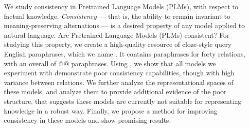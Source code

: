 We study consistency in Pretrained Language Models (PLMs), with respect to factual knowledge. \textit{Consistency} --- that is, the ability to remain invariant to meaning-preserving alternations --- is a desired property of any model applied to natural language. Are Pretrained Language Models (PLMs) consistent?
For studying this property, we create a high-quality resource of cloze-style query English paraphrases, which we name \resource{}. It contains paraphrases for forty relations, with an overall of @@ paraphrases.
Using \resource{}, we show that all models we experiment with demonstrate poor consistency capabilities, though with high variance between relations.
We further analyze the representational spaces of these models, and analyze them to provide additional evidence of the poor structure, that suggests these models are currently not suitable for representing knowledge in a robust way.
Finally, we propose a method for improving consistency in these models and show promising results.
